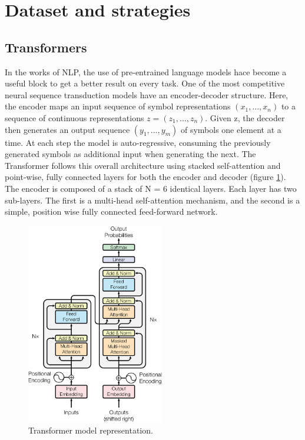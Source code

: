 \section{Dataset and strategies}

\subsection{Transformers}

In the works of NLP, the use of pre-entrained language models hace become a useful block to get a better result on every task. One of the most competitive neural sequence transduction models have an encoder-decoder structure\cite{Bahdanau_2014,Cho_2014}. Here, the encoder maps an input sequence of symbol representations $(x_1 , \dots, x_n)$ to a sequence of continuous representations $z = (z_1 , \dots, z_n )$. Given z, the decoder then generates an output sequence $(y_1 , \dots, y_m )$ of symbols one element at a time. At each step the model is auto-regressive\cite{Graves_2013}, consuming the previously generated symbols as additional input when generating the next. The Transformer follows this overall architecture using stacked self-attention and point-wise, fully connected layers for both the encoder and decoder (figure \ref{fig:transformer}). The encoder is composed of a stack of N = 6 identical layers. Each layer has two sub-layers. The first is a multi-head self-attention mechanism, and the second is a simple, position wise fully connected feed-forward network.

\begin{figure}[H]
    \centering
    \includegraphics[width=6cm]{Graphics/transformer.png}
    \caption{Transformer model representation\cite{Vaswani_2017}.}
    \label{fig:transformer}
\end{figure}

